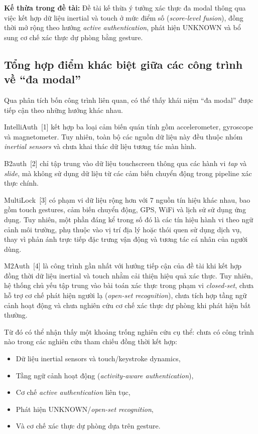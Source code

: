 \documentclass[../DoAn.tex]{subfiles}
\begin{document}
    \textbf{Kế thừa trong đề tài:} Đề tài kế thừa ý tưởng xác thực đa modal thông qua việc kết hợp dữ liệu inertial và touch ở mức điểm số (\textit{score-level fusion}), đồng thời mở rộng theo hướng \textit{active authentication}, phát hiện UNKNOWN và bổ sung cơ chế xác thực dự phòng bằng gesture.

    \subsection{Tổng hợp điểm khác biệt giữa các công trình về ``đa modal''}

    Qua phân tích bốn công trình liên quan, có thể thấy khái niệm ``đa modal'' được tiếp cận theo những hướng khác nhau.
    
    IntelliAuth~[1] kết hợp ba loại cảm biến quán tính gồm accelerometer, gyroscope và magnetometer. Tuy nhiên, toàn bộ các nguồn dữ liệu này đều thuộc nhóm \textit{inertial sensors} và chưa khai thác dữ liệu tương tác màn hình.
    
    B2auth~[2] chỉ tập trung vào dữ liệu touchscreen thông qua các hành vi \textit{tap} và \textit{slide}, mà không sử dụng dữ liệu từ các cảm biến chuyển động trong pipeline xác thực chính.
    
    MultiLock~[3] có phạm vi dữ liệu rộng hơn với 7 nguồn tín hiệu khác nhau, bao gồm touch gestures, cảm biến chuyển động, GPS, WiFi và lịch sử sử dụng ứng dụng. Tuy nhiên, một phần đáng kể trong số đó là các tín hiệu hành vi theo ngữ cảnh môi trường, phụ thuộc vào vị trí địa lý hoặc thói quen sử dụng dịch vụ, thay vì phản ánh trực tiếp đặc trưng vận động và tương tác cá nhân của người dùng.
    
    M2Auth~[4] là công trình gần nhất với hướng tiếp cận của đề tài khi kết hợp đồng thời dữ liệu inertial và touch nhằm cải thiện hiệu quả xác thực. Tuy nhiên, hệ thống chủ yếu tập trung vào bài toán xác thực trong phạm vi \textit{closed-set}, chưa hỗ trợ cơ chế phát hiện người lạ (\textit{open-set recognition}), chưa tích hợp tầng ngữ cảnh hoạt động và chưa nghiên cứu cơ chế xác thực dự phòng khi phát hiện bất thường.
    
    Từ đó có thể nhận thấy một khoảng trống nghiên cứu cụ thể: chưa có công trình nào trong các nghiên cứu tham chiếu đồng thời kết hợp:
    \begin{itemize}
        \item Dữ liệu inertial sensors và touch/keystroke dynamics,
        
        \item Tầng ngữ cảnh hoạt động (\textit{activity-aware authentication}),
        
        \item Cơ chế \textit{active authentication} liên tục,
        
        \item Phát hiện UNKNOWN/\textit{open-set recognition},
        
        \item Và cơ chế xác thực dự phòng dựa trên gesture.
    \end{itemize}
    
\end{document}
